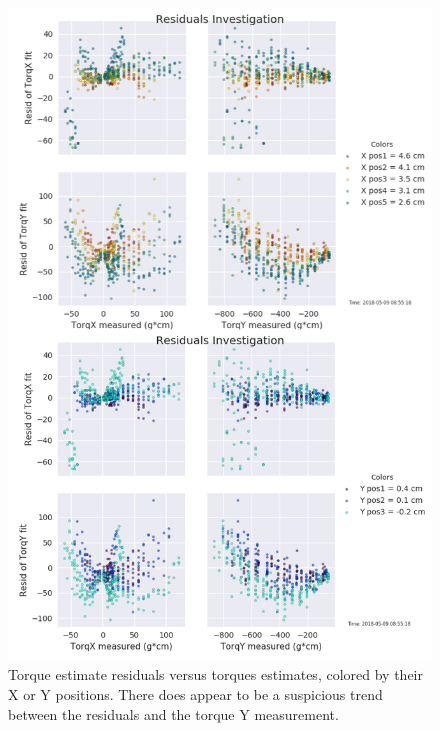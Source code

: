 \documentclass[preprint,12pt,3p]{elsarticle}
\begin{document}
\begin{figure}[H]
\centering
\includegraphics[width=.95\textwidth]{images/round1/resids_Torq.png}
\caption{Torque estimate residuals versus torques estimates, colored by their X or Y positions.
There does appear to be a suspicious trend between the residuals and the torque Y measurement.}
\end{figure}

\end{document}
